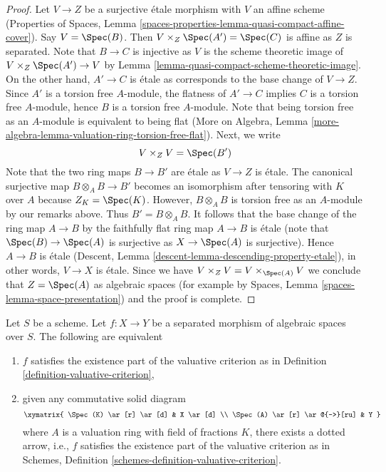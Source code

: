 \begin{proof}
\medskip\noindent
Let $V \to Z$ be a surjective \'etale morphism with $V$ an
affine scheme (Properties of Spaces, Lemma
\ref{spaces-properties-lemma-quasi-compact-affine-cover}).
Say $V = \Spec(B)$. Then $V \times_Z \Spec(A') = \Spec(C)$
is affine as $Z$ is separated. Note that $B \to C$ is injective
as $V$ is the scheme theoretic image of $V \times_Z \Spec(A') \to V$
by Lemma \ref{lemma-quasi-compact-scheme-theoretic-image}.
On the other hand, $A' \to C$ is \'etale as corresponds
to the base change of $V \to Z$.
Since $A'$ is a torsion free $A$-module,
the flatness of $A' \to C$ implies $C$ is a torsion free
$A$-module, hence $B$ is a torsion free $A$-module.
Note that being torsion free as an $A$-module is
equivalent to being flat (More on Algebra, Lemma
\ref{more-algebra-lemma-valuation-ring-torsion-free-flat}).
Next, we write
$$
V \times_Z V = \Spec(B')
$$
Note that the two ring maps $B \to B'$ are \'etale as $V \to Z$
is \'etale. The canonical surjective map $B \otimes_A B \to B'$
becomes an isomorphism after tensoring with $K$ over $A$
because $Z_K = \Spec(K)$. However, $B \otimes_A B$ is torsion
free as an $A$-module by our remarks above. Thus $B' = B \otimes_A B$.
It follows that the base change of the ring map
$A \to B$ by the faithfully flat ring map $A \to B$
is \'etale (note that $\Spec(B) \to \Spec(A)$ is surjective
as $X \to \Spec(A)$ is surjective). Hence $A \to B$ is
\'etale (Descent, Lemma \ref{descent-lemma-descending-property-etale}),
in other words, $V \to X$ is \'etale.
Since we have $V \times_Z V = V \times_{\Spec(A)} V$
we conclude that $Z = \Spec(A)$ as algebraic spaces
(for example by Spaces, Lemma \ref{spaces-lemma-space-presentation})
and the proof is complete.
\end{proof}

\begin{lemma}
\label{lemma-usual-enough}
Let $S$ be a scheme. Let $f : X \to Y$ be a separated morphism of
algebraic spaces over $S$. The following are equivalent
\begin{enumerate}
\item $f$ satisfies the existence part of the valuative criterion
as in Definition \ref{definition-valuative-criterion},
\item given any commutative solid diagram
$$
\xymatrix{
\Spec(K) \ar[r] \ar[d] & X \ar[d] \\
\Spec(A) \ar[r] \ar@{-->}[ru] & Y
}
$$
where $A$ is a valuation ring with field of fractions $K$, there exists
a dotted arrow, i.e., $f$ satisfies the existence part of the valuative
criterion as in
Schemes, Definition \ref{schemes-definition-valuative-criterion}.
\end{enumerate}
\end{lemma}

